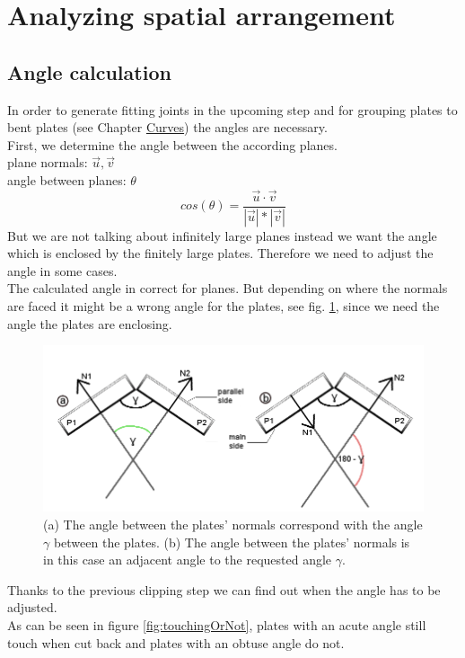 \documentclass[../ClassicThesis.tex]{subfiles}
\begin{document}
\section{Analyzing spatial arrangement}
\subsection{Angle calculation}\label{angleCalculation}
In order to generate fitting joints in the upcoming step and for grouping plates to bent plates (see Chapter \hyperref[ch:curves]{Curves}) the angles are necessary.\\
First, we determine the angle between the according planes.\\
plane normals: $\vec{u}, \vec{v}$\\
angle between planes: $\theta$
$$ cos(\theta) = \frac{\vec{u} \cdot \vec{v}}{|\vec{u}| * |\vec{v}|}$$
But we are not talking about infinitely large planes instead we want the angle which is enclosed by the finitely large plates. Therefore we need to adjust the angle in some cases.\\
The calculated angle in correct for planes. But depending on where the normals are faced it might be a wrong angle for the plates, see fig. \ref{fig:wrongAngle}, since we need the angle the plates are enclosing.
\begin{figure}[!ht]
\centering
\includegraphics[width= 1\columnwidth]{Images/anglesExamplesSmall.png}
\caption{(a) The angle between the plates' normals correspond with the angle $\gamma$ between the plates. (b) The angle between the plates' normals is in this case an adjacent angle to the requested angle $\gamma$.}
\label{fig:wrongAngle}
\end{figure}
Thanks to the previous clipping step we can find out when the angle has to be adjusted.\\
As can be seen in figure \ref{fig:touchingOrNot}, plates with an acute angle still touch when cut back and plates with an obtuse angle do not.
\end{document}
